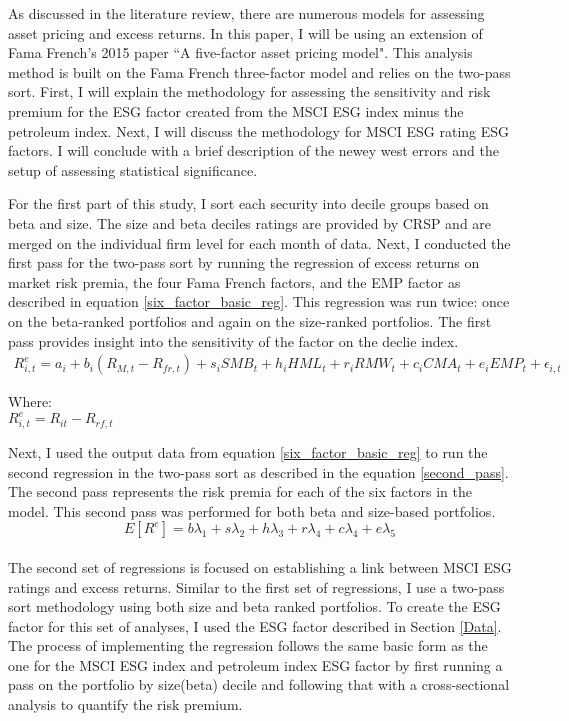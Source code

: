 As discussed in the literature review, there are numerous models for assessing asset pricing and excess returns. In this paper, I will be using an extension of Fama French's 2015 paper ``A five-factor asset pricing model". This analysis method is built on the Fama French three-factor model and relies on the two-pass sort. First, I will explain the methodology for assessing the sensitivity and risk premium for the ESG factor created from the MSCI ESG index minus the petroleum index. Next, I will discuss the methodology for MSCI ESG rating ESG factors. I will conclude with a brief description of the newey west errors and the setup of assessing statistical significance. 


For the first part of this study, I sort each security into decile groups based on beta and size. The size and beta deciles ratings are provided by CRSP and are merged on the individual firm level for each month of data. Next, I conducted the first pass for the two-pass sort by running the regression of excess returns on market risk premia, the four Fama French factors, and the EMP factor as described in equation \eqref{six_factor_basic_reg}. This regression was run twice: once on the beta-ranked portfolios and again on the size-ranked portfolios. The first pass provides insight into the sensitivity of the factor on the declie index. 
\begin{equation}
\begin{split}
    R_{i,t}^e = a_i+b_i(R_{M,t}-R_{fr,t})+s_iSMB_t+ h_iHML_t+  r_iRMW_t+c_iCMA_t+e_iEMP_t +\epsilon_{i,t}
    \end{split}
    \label{six_factor_basic_reg}
\end{equation}
\begin{center}
Where:\\
    $R_{i,t}^e = R_{it}-R_{rf,t}$
\end{center}
Next, I used the output data from equation \eqref{six_factor_basic_reg} to run the second regression in the two-pass sort as described in the equation  \eqref{second_pass}. The second pass represents the risk premia for each of the six factors in the model. This second pass was performed for both beta and size-based portfolios.
\begin{equation}
    E[R^e]= b\lambda_1+s\lambda_2 +h\lambda_3 +r\lambda_4 +c \lambda_4 + e\lambda_5
    \label{second_pass}
\end{equation}\\
The second set of regressions is focused on establishing a link between MSCI ESG ratings and excess returns. Similar to the first set of regressions, I use a two-pass sort methodology using both size and beta ranked portfolios. To create the ESG factor for this set of analyses, I used the ESG factor described in Section \ref{Data}. The process of implementing the regression follows the same basic form as the one for the MSCI ESG index and petroleum index ESG factor by first running a pass on the portfolio by size(beta) decile and following that with a cross-sectional analysis to quantify the risk premium. 

